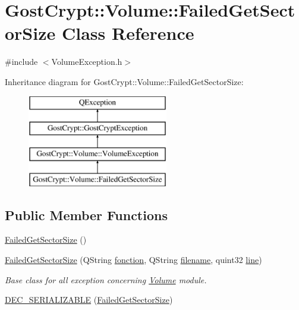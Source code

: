 \hypertarget{class_gost_crypt_1_1_volume_1_1_failed_get_sector_size}{}\section{Gost\+Crypt\+:\+:Volume\+:\+:Failed\+Get\+Sector\+Size Class Reference}
\label{class_gost_crypt_1_1_volume_1_1_failed_get_sector_size}


{\ttfamily \#include $<$Volume\+Exception.\+h$>$}

Inheritance diagram for Gost\+Crypt\+:\+:Volume\+:\+:Failed\+Get\+Sector\+Size\+:\begin{figure}[H]
\begin{center}
\leavevmode
\includegraphics[height=4.000000cm]{class_gost_crypt_1_1_volume_1_1_failed_get_sector_size}
\end{center}
\end{figure}
\subsection*{Public Member Functions}
\begin{DoxyCompactItemize}
\item 
\hyperlink{class_gost_crypt_1_1_volume_1_1_failed_get_sector_size_a19da4ce246ca970de2e9dd0ceda832df}{Failed\+Get\+Sector\+Size} ()
\item 
\hyperlink{class_gost_crypt_1_1_volume_1_1_failed_get_sector_size_ab1613680998a9d0fc9d5e46e05bcce53}{Failed\+Get\+Sector\+Size} (Q\+String \hyperlink{class_gost_crypt_1_1_gost_crypt_exception_a29b8c93d5efbb1ff369107385725a939}{fonction}, Q\+String \hyperlink{class_gost_crypt_1_1_gost_crypt_exception_a749a12375f4ba9d502623b99d8252f38}{filename}, quint32 \hyperlink{class_gost_crypt_1_1_gost_crypt_exception_abf506d911f12a4e969eea500f90bd32c}{line})
\begin{DoxyCompactList}\small\item\em Base class for all exception concerning \hyperlink{class_gost_crypt_1_1_volume_1_1_volume}{Volume} module. \end{DoxyCompactList}\item 
\hyperlink{class_gost_crypt_1_1_volume_1_1_failed_get_sector_size_a95661700fe15ef7d8c7189c66d59af1f}{D\+E\+C\+\_\+\+S\+E\+R\+I\+A\+L\+I\+Z\+A\+B\+LE} (\hyperlink{class_gost_crypt_1_1_volume_1_1_failed_get_sector_size}{Failed\+Get\+Sector\+Size})
\end{DoxyCompactItemize}
